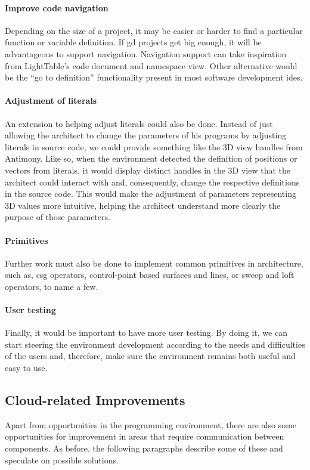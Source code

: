 \paragraph{Improve code navigation}
Depending on the size of a project, it may be easier or harder to find a particular function or variable definition.
If \gls{gd} projects get big enough, it will be advantageous to support navigation.
Navigation support can take inspiration from LightTable's code document and namespace view.
Other alternative would be the ``go to definition'' functionality present in most software development \glspl{ide}.

\paragraph{Adjustment of literals}
An extension to helping adjust literals could also be done.
Instead of just allowing the architect to change the parameters of his programs by adjusting literals in source code, we could provide something like the 3D view handles from Antimony.
Like so, when the environment detected the definition of positions or vectors from literals, it would display distinct handles in the 3D view that the architect could interact with and, consequently, change the respective definitions in the source code.
This would make the adjustment of parameters representing 3D values more intuitive, helping the architect understand more clearly the purpose of those parameters.

\paragraph{Primitives}
Further work must also be done to implement common primitives in architecture, such as, \gls{csg} operators, control-point based surfaces and lines, or sweep and loft operators, to name a few.

\paragraph{User testing}
Finally, it would be important to have more user testing.
By doing it, we can start steering the environment development according to the needs and difficulties of the users and, therefore, make sure the environment remains both useful and easy to use.


\subsection{Cloud-related Improvements}
Apart from opportunities in the programming environment, there are also some opportunities for improvement in areas that require communication between components.
As before, the following paragraphs describe some of these and speculate on possible solutions.

